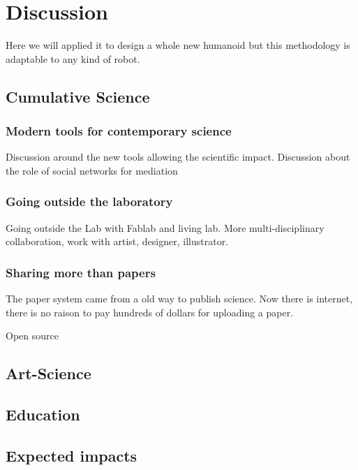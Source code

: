 

\chapter{Discussion} %

Here we will applied it to design a whole new humanoid but this methodology is adaptable to any kind of robot.


\section{Cumulative Science} %

\subsection{Modern tools for contemporary science} %

Discussion around the new tools allowing the scientific impact. 
Discussion about the role of social networks for mediation

\subsection{Going outside the laboratory} %
Going outside the Lab with Fablab and living lab.
More multi-disciplinary collaboration, work with artist, designer, illustrator. 


\subsection{Sharing more than papers} %

The paper system came from a old way to publish science. Now there is internet, there is no raison to pay hundreds of dollars for uploading a paper.

Open source

\section{Art-Science} %

\section{Education} %


\section{Expected impacts} %

